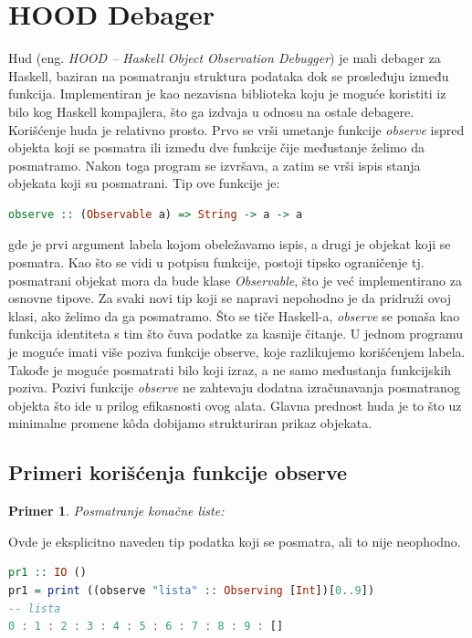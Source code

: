 \documentclass[a4paper]{article}
\newtheorem{primer}{Primer}[section]
\begin{document}


\section{HOOD Debager}
Hud (eng. {\em HOOD -- Haskell Object Observation Debugger}) je mali debager za Haskell, baziran na posmatranju struktura podataka dok se prosleđuju između funkcija.
Implementiran je kao nezavisna biblioteka koju je moguće koristiti iz bilo kog Haskell kompajlera, što ga izdvaja u odnosu na ostale debagere.
Korišćenje huda je relativno prosto. Prvo se vrši umetanje funkcije {\em observe} ispred objekta koji se posmatra ili između dve funkcije čije međustanje želimo da posmatramo.
Nakon toga program se izvršava, a zatim se vrši ispis stanja objekata koji su posmatrani.
Tip ove funkcije je:\newline

\begin{lstlisting}[language=Haskell]
observe :: (Observable a) => String -> a -> a
\end{lstlisting} 

gde je prvi argument labela kojom obeležavamo ispis, a drugi je objekat koji se posmatra.
Kao što se vidi u potpisu funkcije, postoji tipsko ograničenje tj. posmatrani objekat mora da bude klase {\em Observable}, što je već implementirano za osnovne tipove.
Za svaki novi tip koji se napravi nepohodno je da  pridruži ovoj klasi, ako želimo da ga posmatramo.
Što se tiče Haskell-a, {\em observe} se ponaša kao funkcija identiteta s tim što čuva podatke za kasnije čitanje.
U jednom programu je moguće imati više poziva funkcije observe, koje razlikujemo korišćenjem labela.
Takođe je moguće posmatrati bilo koji izraz, a ne samo međustanja funkcijskih poziva.
Pozivi funkcije {\em observe} ne zahtevaju dodatna izračunavanja posmatranog objekta što ide u prilog efikasnosti ovog alata.
Glavna prednost huda je to što uz minimalne promene k\^{o}da dobijamo strukturiran prikaz objekata.

\subsection{Primeri korišćenja funkcije observe}
\begin{primer}
 Posmatranje konačne liste:
\end{primer}
Ovde je eksplicitno naveden tip podatka koji se posmatra, ali to nije neophodno.
\begin{lstlisting}[language=Haskell]
pr1 :: IO ()
pr1 = print ((observe "lista" :: Observing [Int])[0..9])
-- lista
0 : 1 : 2 : 3 : 4 : 5 : 6 : 7 : 8 : 9 : []
\end{lstlisting}
\end{document}
